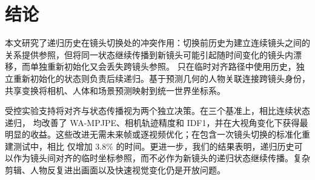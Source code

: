 \section{结论}

本文研究了递归历史在镜头切换处的冲突作用：切换前历史为建立连续镜头之间的关系提供参照，但将同一状态继续传播到新镜头可能引起随时间变化的镜头内漂移，而单独重新初始化又会丢失跨镜头参照。\method{} 只在临时对齐路径中使用历史，独立重新初始化的状态则负责后续递归。基于预测几何的人物关联连接跨镜头身份，共享变换将相机、人体和场景预测映射到统一世界坐标系。

受控实验支持将对齐与状态传播视为两个独立决策。在三个基准上，相比连续状态递归，\method{} 均改善了 WA-MPJPE、相机轨迹精度和 IDF1，并在大视角变化下获得最明显的收益。这些改进无需未来帧或逐视频优化；在包含一次镜头切换的标准化重建测试中，相比 \humanthree{} 仅增加 3.8\% 的时间。更进一步，我们的结果表明，递归历史可以作为镜头间对齐的临时坐标参照，而不必作为新镜头的递归状态继续传播。复杂剪辑、人物反复进出画面以及快速视觉变化仍是开放问题。
